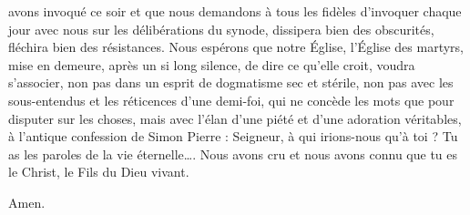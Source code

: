 avons invoqué ce soir et que nous demandons à tous les fidèles d’invoquer chaque jour avec nous sur les délibérations du synode, dissipera bien des obscurités, fléchira bien des résistances. Nous espérons que notre Église, l’Église des martyrs, mise en demeure, après un si long silence, de dire ce qu’elle croit, voudra s’associer, non pas dans un esprit de dogmatisme sec et stérile, non pas avec les sous-entendus et les réticences d’une demi-foi, qui ne concède les mots que pour disputer sur les choses, mais avec l’élan d’une piété et d’une adoration véritables, à l’antique confession de Simon Pierre : \Og{} Seigneur, à qui irions-nous qu’à toi ? Tu as les paroles de la vie éternelle…. Nous avons cru et nous avons connu que tu es le Christ, le Fils du Dieu vivant. \Fg{}

Amen.     

